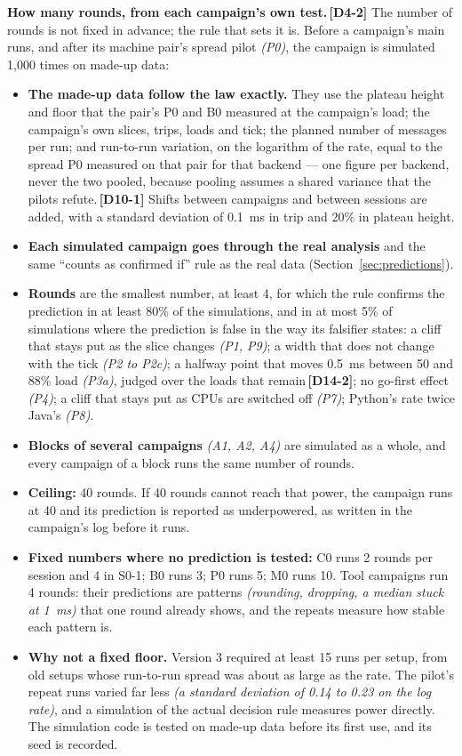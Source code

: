 \documentclass[11pt]{article}
\newcommand{\gl}[1]{{\color{soft}\itshape\small (#1)}}
\newcommand{\chgold}[1]{\,{\color{oldcol}\bfseries\footnotesize[#1]}}
\begin{document}
\textbf{How many rounds, from each campaign's own test.}\chgold{D4-2} The number of rounds is not fixed in advance; the rule that sets it is. Before a campaign's main runs, and after its machine pair's spread pilot \gl{P0}, the campaign is simulated 1,000 times on made-up data:
\begin{itemize}
  \item \textbf{The made-up data follow the law exactly.} They use the plateau height and floor that the pair's P0 and B0 measured at the campaign's load; the campaign's own slices, trips, loads and tick; the planned number of messages per run; and run-to-run variation, on the logarithm of the rate, equal to the spread P0 measured on that pair for that backend --- one figure per backend, never the two pooled, because pooling assumes a shared variance that the pilots refute.\chgold{D10-1} Shifts between campaigns and between sessions are added, with a standard deviation of 0.1~ms in trip and 20\% in plateau height.
  \item \textbf{Each simulated campaign goes through the real analysis} and the same ``counts as confirmed if'' rule as the real data (Section~\ref{sec:predictions}).
  \item \textbf{Rounds} are the smallest number, at least 4, for which the rule confirms the prediction in at least 80\% of the simulations, and in at most 5\% of simulations where the prediction is false in the way its falsifier states: a cliff that stays put as the slice changes \gl{P1, P9}; a width that does not change with the tick \gl{P2 to P2c}; a halfway point that moves 0.5~ms between 50 and 88\% load \gl{P3a}, judged over the loads that remain\chgold{D14-2}; no go-first effect \gl{P4}; a cliff that stays put as CPUs are switched off \gl{P7}; Python's rate twice Java's \gl{P8}.
  \item \textbf{Blocks of several campaigns} \gl{A1, A2, A4} are simulated as a whole, and every campaign of a block runs the same number of rounds.
  \item \textbf{Ceiling:} 40 rounds. If 40 rounds cannot reach that power, the campaign runs at 40 and its prediction is reported as underpowered, as written in the campaign's log before it runs.
  \item \textbf{Fixed numbers where no prediction is tested:} C0 runs 2 rounds per session and 4 in S0-1; B0 runs 3; P0 runs 5; M0 runs 10. Tool campaigns run 4 rounds: their predictions are patterns \gl{rounding, dropping, a median stuck at 1~ms} that one round already shows, and the repeats measure how stable each pattern is.
  \item \textbf{Why not a fixed floor.} Version 3 required at least 15 runs per setup, from old setups whose run-to-run spread was about as large as the rate. The pilot's repeat runs varied far less \gl{a standard deviation of 0.14 to 0.23 on the log rate}, and a simulation of the actual decision rule measures power directly. The simulation code is tested on made-up data before its first use, and its seed is recorded.
\end{itemize}
\end{document}
